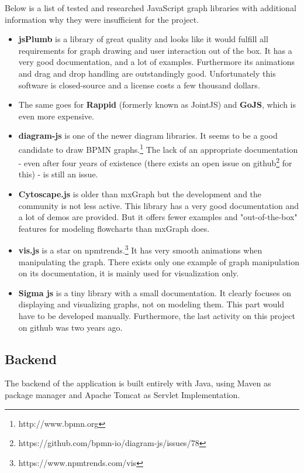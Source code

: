 \documentclass[a4paper,top=25mm,bottom=25mm,12pt,pdftex,halfparskip,twoside,bibtotoc,numbers=noenddot]{scrbook}
\begin{document}
Below is a list of tested and researched JavaScript graph libraries with additional information why they were insufficient for the project.
\begin{itemize}
	\item \textbf{jsPlumb} is a library of great quality and looks like it would fulfill all  requirements for graph drawing and user interaction out of the box. It has a very good documentation, and a lot of examples. Furthermore its animations and drag and drop handling are outstandingly good. Unfortunately this software is closed-source and a license costs a few thousand dollars.
	\item The same goes for \textbf{Rappid} (formerly known as JointJS) and \textbf{GoJS}, which is even more expensive.
	\item \textbf{diagram-js} is one of the newer diagram libraries. It seems to be a good candidate to draw BPMN graphs.\footnote{http://www.bpmn.org} The lack of an appropriate documentation - even after four years of existence (there exists an open issue on github\footnote{https://github.com/bpmn-io/diagram-js/issues/78} for this) - is still an issue.
	\item \textbf{Cytoscape.js} is older than mxGraph but the development and the community is not less active. This library has a very good documentation and a lot of demos are provided. But it offers fewer examples and "out-of-the-box" features for modeling flowcharts than mxGraph does.
	\item \textbf{vis.js} is a star on npmtrends.\footnote{https://www.npmtrends.com/vis}  It has very smooth animations when manipulating the graph. There exists only one example of graph manipulation on its documentation, it is mainly used for visualization only.
	\item \textbf{Sigma js} is a tiny library with a small documentation. It clearly focuses on displaying and visualizing graphs, not on modeling them. This part would have to be developed manually. Furthermore, the last activity on this project on github was two years ago.
\end{itemize}


\subsection{Backend}

The backend  of the application is built entirely with Java, using Maven as package manager and Apache Tomcat as Servlet Implementation.
\end{document}
